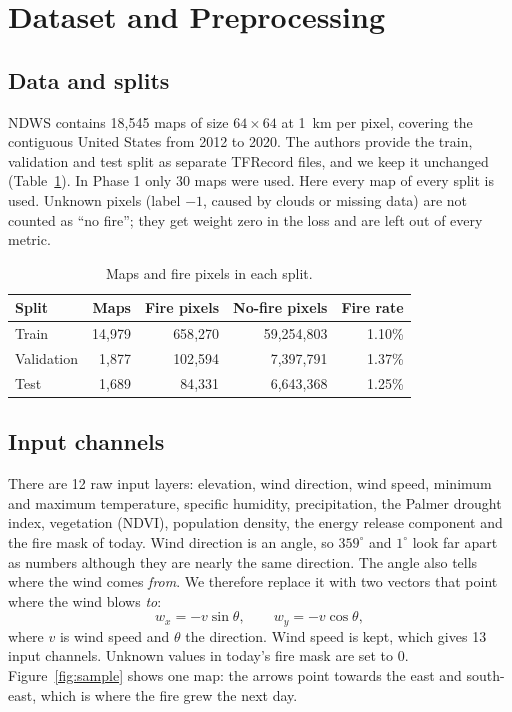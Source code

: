 \section{Dataset and Preprocessing}
\subsection{Data and splits}
NDWS contains 18{,}545 maps of size $64\times64$ at 1~km per pixel, covering the contiguous United States from 2012 to 2020. The authors provide the train, validation and test split as separate TFRecord files, and we keep it unchanged (Table~\ref{tab:splits}). In Phase 1 only 30 maps were used. Here every map of every split is used. Unknown pixels (label $-1$, caused by clouds or missing data) are not counted as ``no fire''; they get weight zero in the loss and are left out of every metric.

\begin{table}[t]
\centering
\caption{Maps and fire pixels in each split.}
\label{tab:splits}
\footnotesize
\begin{tabular}{lrrrr}
\toprule
Split & Maps & Fire pixels & No-fire pixels & Fire rate \\
\midrule
Train & 14{,}979 & 658{,}270 & 59{,}254{,}803 & 1.10\% \\
Validation & 1{,}877 & 102{,}594 & 7{,}397{,}791 & 1.37\% \\
Test & 1{,}689 & 84{,}331 & 6{,}643{,}368 & 1.25\% \\
\bottomrule
\end{tabular}
\end{table}

\subsection{Input channels}
There are 12 raw input layers: elevation, wind direction, wind speed, minimum and maximum temperature, specific humidity, precipitation, the Palmer drought index, vegetation (NDVI), population density, the energy release component and the fire mask of today. Wind direction is an angle, so $359^\circ$ and $1^\circ$ look far apart as numbers although they are nearly the same direction. The angle also tells where the wind comes \emph{from}. We therefore replace it with two vectors that point where the wind blows \emph{to}:
\begin{equation}
w_x = -v\sin\theta, \qquad w_y = -v\cos\theta,
\end{equation}
where $v$ is wind speed and $\theta$ the direction. Wind speed is kept, which gives 13 input channels. Unknown values in today's fire mask are set to 0. Figure~\ref{fig:sample} shows one map: the arrows point towards the east and south-east, which is where the fire grew the next day.

